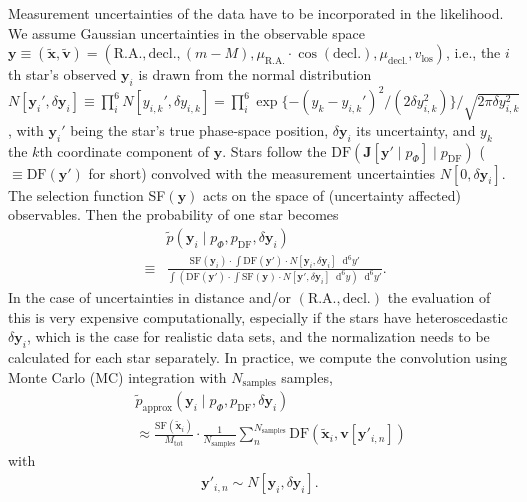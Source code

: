 \documentclass[iop,revtex4,numberedappendix,appendixfloats]{emulateapj}
\newcommand{\vect}[1]{\boldsymbol{#1}}
\newcommand*\Diff[1]{\mathop{}\!\mathrm{d^#1}}
\begin{document}
Measurement uncertainties of the data have to be incorporated in the likelihood. We assume Gaussian uncertainties in the observable space $\vect{y} \equiv (\tilde{\vect{x}},\tilde{\vect{v}})=(\text{R.A.},\text{decl.},(m-M),\mu_\text{R.A.} \cdot \cos (\text{decl.}),\mu_\text{decl.},v_\text{los})$, i.e., the $i$th star's observed $\vect{y}_i$ is drawn from the normal distribution $N[{\vect{y}_i}',\delta \vect{y}_i] \equiv \prod_i^6 N[{y_{i,k}}',\delta y_{i,k}] = \prod_i^6 \exp \{-(y_{k}-{y_{i,k}}')^2/ (2 \delta y_{i,k}^2) \} / \sqrt{2 \pi \delta y_{i,k}^2}$, with ${\vect{y}_i}'$ being the star's true phase-space position, $\delta \vect{y}_i$ its uncertainty, and $y_k$ the $k$th coordinate component of $\vect{y}$. Stars follow the $\text{DF}(\vect{J}[\vect{y}' \mid p_\Phi] \mid p_\text{DF})$ ($\equiv \text{DF}(\vect{y}')$ for short) convolved with the measurement uncertainties $N[0,\delta \vect{y}_i]$. The selection function SF$(\vect{y})$ acts on the space of (uncertainty affected) observables. Then the probability of one star becomes
\begin{eqnarray}
&&\tilde{p}(\vect{y}_i \mid p_\Phi,p_\text{DF},\delta \vect{y}_i)\nonumber\\
& \equiv& \frac{\text{SF}(\vect{y}_i) \cdot \int \text{DF}(\vect{y}') \cdot N[\vect{y}_i,\delta \vect{y}_i] \Diff{6} y'}{\int \left( \text{DF}(\vect{y}') \cdot \int \text{SF}(\vect{y}) \cdot N[\vect{y}',\delta \vect{y}_i] \Diff{6} y \right) \Diff{6}y'}.
\end{eqnarray}
In the case of uncertainties in distance and/or $(\text{R.A.},\text{decl.})$ the evaluation of this is very expensive computationally, especially if the stars have heteroscedastic $\delta \vect{y}_i$, which is the case for realistic data sets, and the normalization needs to be calculated for each star separately. In practice, we compute the convolution using Monte Carlo (MC) integration with $N_\text{samples}$ samples,
\begin{eqnarray}
&&\tilde{p}_\text{approx}(\vect{y}_i \mid p_\Phi,p_\text{DF},\delta \vect{y}_i) \nonumber\\
&&\approx \frac{ \text{SF}(\tilde{\vect{x}}_i)}{M_\text{tot}} \cdot \frac{1}{N_\text{samples}} \sum_n^{N_\text{samples}} \text{DF}(\tilde{\vect{x}}_i,\vect{v}[\vect{y}'_{i,n}]) \label{eq:errorconv}
\end{eqnarray}
with
\begin{eqnarray}
\vect{y}'_{i,n} \sim N[\vect{y}_i,\delta \vect{y}_i].\nonumber
\end{eqnarray}
\end{document}
